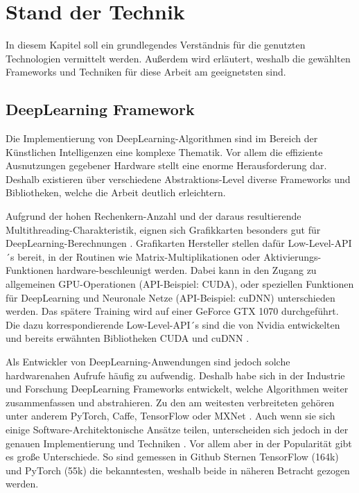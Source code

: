 
\chapter{Stand der Technik}
In diesem Kapitel soll ein grundlegendes Verständnis für die genutzten Technologien vermittelt werden.
Außerdem wird erläutert, weshalb die gewählten Frameworks und Techniken für diese Arbeit am geeignetsten sind.

\section{DeepLearning Framework}
Die Implementierung von DeepLearning-Algorithmen sind im Bereich der Künstlichen Intelligenzen eine komplexe Thematik.
Vor allem die effiziente Ausnutzungen gegebener Hardware stellt eine enorme Herausforderung dar. 
Deshalb existieren über verschiedene Abstraktions-Level diverse Frameworks und Bibliotheken, welche die Arbeit deutlich erleichtern.
\newline

Aufgrund der hohen Rechenkern-Anzahl und der daraus resultierende Multithreading-Charakteristik, eignen sich Grafikkarten besonders gut für DeepLearning-Berechnungen \cite{gpu-for-dl}.
Grafikarten Hersteller stellen dafür Low-Level-API´s bereit, in der Routinen wie Matrix-Multiplikationen oder Aktivierungs-Funktionen hardware-beschleunigt werden.
Dabei kann in den Zugang zu allgemeinen GPU-Operationen (API-Beispiel: CUDA), oder speziellen Funktionen für DeepLearning und Neuronale Netze (API-Beispiel: cuDNN) unterschieden werden.
Das spätere Training wird auf einer GeForce GTX 1070 \cite{gtx-1070} durchgeführt.
Die dazu korrespondierende Low-Level-API´s sind die von Nvidia entwickelten und bereits erwähnten Bibliotheken CUDA \cite{cuda-doc} und cuDNN \cite{cudnn-doc}.  
\newline

Als Entwickler von DeepLearning-Anwendungen sind jedoch solche hardwarenahen Aufrufe häufig zu aufwendig.
Deshalb habe sich in der Industrie und Forschung DeepLearning Frameworks entwickelt, welche Algorithmen weiter zusammenfassen und abstrahieren.
Zu den am weitesten verbreiteten gehören unter anderem PyTorch, Caffe, TensorFlow oder MXNet \cite[S. 2018]{dl-framework-evaluation}. %
Auch wenn sie sich einige Software-Architektonische Ansätze teilen, unterscheiden sich jedoch in der genauen Implementierung und Techniken \cite[S. 2018, 2020]{dl-framework-evaluation}.
Vor allem aber in der Popularität gibt es große Unterschiede.
So sind gemessen in Github Sternen TensorFlow (164k) \cite{github-tensorflow} und PyTorch (55k) \cite{github-pytorch} die bekanntesten, weshalb beide in näheren Betracht gezogen werden.
 

